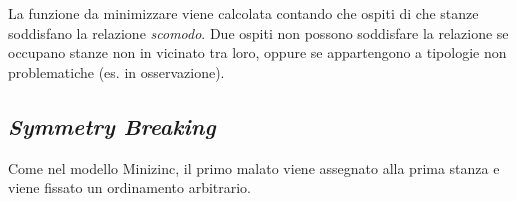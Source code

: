 \noindent
La funzione da minimizzare viene calcolata contando che ospiti di che stanze soddisfano la relazione \emph{scomodo}.
Due ospiti non possono soddisfare la relazione se occupano stanze non in vicinato tra loro, oppure se appartengono a tipologie non problematiche (es. in osservazione).


\subsection{\emph{Symmetry Breaking}}
Come nel modello Minizinc, il primo malato viene assegnato alla prima stanza e viene fissato un ordinamento arbitrario.


